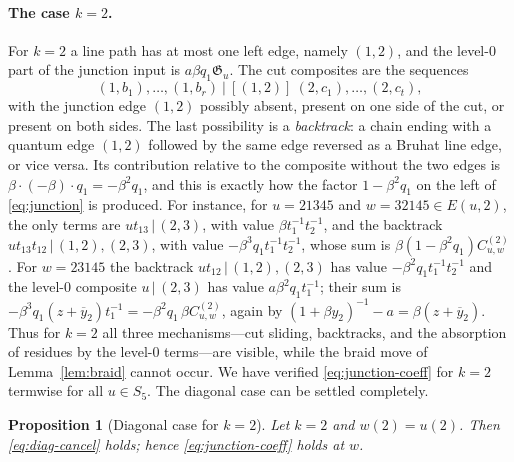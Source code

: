 \documentclass[11pt]{article}
\newtheorem{proposition}{Proposition}
\newcommand{\G}{\mathfrak{G}}
\begin{document}
\paragraph{The case \texorpdfstring{$k=2$}{k=2}.}
For $k=2$ a line path has at most one left edge, namely $(1,2)$, and
the level-$0$ part of the junction input is $a\beta q_1\G_u$. The
cut composites are the sequences
\[
 (1,b_1),\ldots,(1,b_r)\ \big|\ [(1,2)]\ (2,c_1),\ldots,(2,c_t),
\]
with the junction edge $(1,2)$ possibly absent, present on one side of
the cut, or present on both sides. The last possibility is a
\emph{backtrack}: a chain ending with a quantum edge $(1,2)$ followed
by the same edge reversed as a Bruhat line edge, or vice versa. Its
contribution relative to the composite without the two edges is
$\beta\cdot(-\beta)\cdot q_1=-\beta^2q_1$, and this is exactly how the
factor $1-\beta^2q_1$ on the left of \eqref{eq:junction} is
produced. For instance, for $u=21345$ and $w=32145\in E(u,2)$, the
only terms are $u t_{13}\,\big|\,(2,3)$, with value $\beta t_1^{-1}t_2^{-1}$,
and the backtrack $u t_{13}t_{12}\,\big|\,(1,2),(2,3)$, with value
$-\beta^3q_1t_1^{-1}t_2^{-1}$, whose sum is
$\beta(1-\beta^2q_1)C^{(2)}_{u,w}$. For $w=23145$ the backtrack
$ut_{12}\,\big|\,(1,2),(2,3)$ has value $-\beta^2q_1t_1^{-1}t_2^{-1}$ and the
level-$0$ composite $u\,\big|\,(2,3)$ has value $a\beta^2q_1t_1^{-1}$;
their sum is $-\beta^3q_1(z+\overline y_2)t_1^{-1}=-\beta^2q_1\,\beta C^{(2)}_{u,w}$,
again by $(1+\beta y_2)^{-1}-a=\beta(z+\overline y_2)$. Thus for
$k=2$ all three mechanisms---cut sliding, backtracks, and the
absorption of residues by the level-$0$ terms---are visible, while
the braid move of Lemma~\ref{lem:braid} cannot occur. We have
verified \eqref{eq:junction-coeff} for $k=2$ termwise for all
$u\in S_5$. The diagonal case can be settled completely.

\begin{proposition}[Diagonal case for $k=2$]\label{prop:k2-diag}
Let $k=2$ and $w(2)=u(2)$. Then \eqref{eq:diag-cancel} holds; hence
\eqref{eq:junction-coeff} holds at $w$.
\end{proposition}
\end{document}
